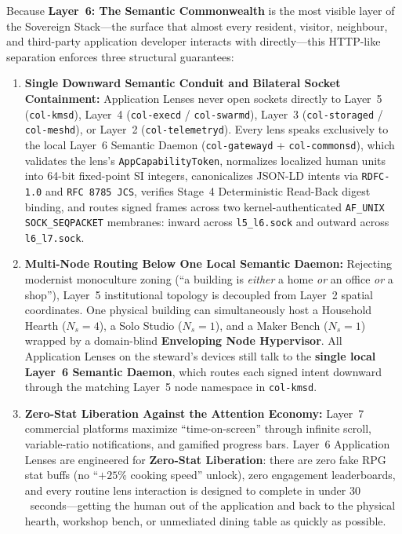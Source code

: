 Because \textbf{Layer~6: The Semantic Commonwealth} is the most visible layer of the Sovereign
Stack---the surface that almost every resident, visitor, neighbour, and third-party application
developer interacts with directly---this HTTP-like separation enforces three structural guarantees:

\begin{enumerate}
\item \textbf{Single Downward Semantic Conduit and Bilateral Socket Containment:} Application
      Lenses never open sockets directly to Layer~5 (\texttt{col-kmsd}), Layer~4
      (\texttt{col-execd} / \texttt{col-swarmd}), Layer~3 (\texttt{col-storaged} /
      \texttt{col-meshd}), or Layer~2 (\texttt{col-telemetryd}). Every lens speaks exclusively to
      the local Layer~6 Semantic Daemon (\texttt{col-gatewayd} + \texttt{col-commonsd}), which
      validates the lens's \texttt{AppCapabilityToken}, normalizes localized human units into
      64-bit fixed-point SI integers, canonicalizes JSON-LD intents via \texttt{RDFC-1.0} and
      \texttt{RFC 8785 JCS}, verifies Stage~4 Deterministic Read-Back digest binding, and routes
      signed frames across two kernel-authenticated \texttt{AF\_UNIX} \texttt{SOCK\_SEQPACKET}
      membranes: inward across \texttt{l5\_l6.sock} and outward across \texttt{l6\_l7.sock}.
\item \textbf{Multi-Node Routing Below One Local Semantic Daemon:} Rejecting modernist monoculture
      zoning (``a building is \textit{either} a home \textit{or} an office \textit{or} a shop''),
      Layer~5 institutional topology is decoupled from Layer~2 spatial coordinates. One physical
      building can simultaneously host a Household Hearth ($N_s=4$), a Solo Studio ($N_s=1$), and a
      Maker Bench ($N_s=1$) wrapped by a domain-blind \textbf{Enveloping Node Hypervisor}. All
      Application Lenses on the steward's devices still talk to the \textbf{single local Layer~6
      Semantic Daemon}, which routes each signed intent downward through the matching Layer~5 node
      namespace in \texttt{col-kmsd}.
\item \textbf{Zero-Stat Liberation Against the Attention Economy:} Layer~7 commercial platforms
      maximize ``time-on-screen'' through infinite scroll, variable-ratio notifications, and
      gamified progress bars. Layer~6 Application Lenses are engineered for \textbf{Zero-Stat
      Liberation}: there are zero fake RPG stat buffs (no ``$+25\%$ cooking speed'' unlock), zero
      engagement leaderboards, and every routine lens interaction is designed to complete in under
      $30$~seconds---getting the human out of the application and back to the physical hearth,
      workshop bench, or unmediated dining table as quickly as possible.
\end{enumerate}

